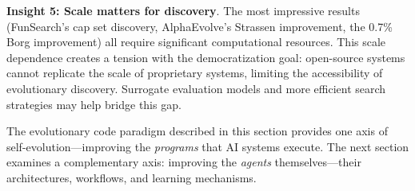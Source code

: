 \textbf{Insight 5: Scale matters for discovery}. The most impressive results (FunSearch's cap set discovery, AlphaEvolve's Strassen improvement, the 0.7\% Borg improvement) all require significant computational resources. This scale dependence creates a tension with the democratization goal: open-source systems cannot replicate the scale of proprietary systems, limiting the accessibility of evolutionary discovery. Surrogate evaluation models and more efficient search strategies may help bridge this gap.

The evolutionary code paradigm described in this section provides one axis of self-evolution---improving the \emph{programs} that AI systems execute. The next section examines a complementary axis: improving the \emph{agents} themselves---their architectures, workflows, and learning mechanisms.
